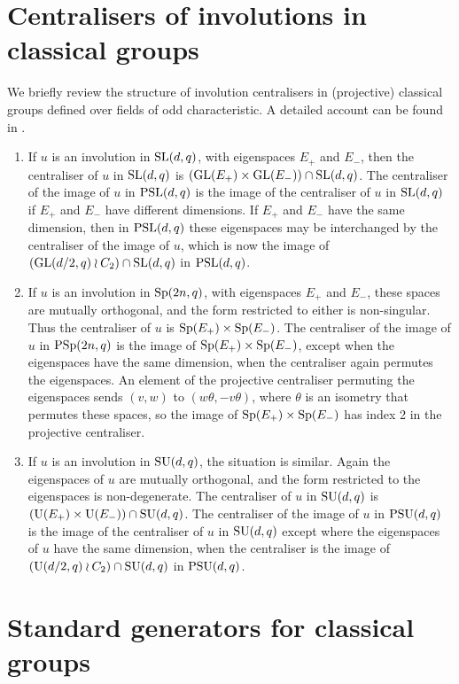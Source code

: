 \documentclass[12pt]{article}
\def\SL{{\rm SL}}
\def\GL{{\rm GL}}
\def\U{{\rm U}}
\def\PSL{{\rm PSL}}
\def\PSp{{\rm PSp}}
\def\PSU{{\rm PSU}}
\def\Sp{{\rm Sp}}
\def\SU{{\rm SU}}
\begin{document}
\section{Centralisers of involutions in classical groups}\label{cent} 
We briefly review the structure of involution centralisers 
in (projective) classical groups 
defined over fields of odd characteristic.
A detailed account can be found in \cite{GLS3}.
\begin{enumerate}
\item 
If $u$ is an involution in $\SL(d,q)$, with eigenspaces $E_+$ and
$E_-$, then the centraliser of $u$ in $\SL(d,q)$ is
$(\GL(E_+)\times\GL(E_-))\cap\SL(d,q)$. The centraliser of the
image of $u$ in $\PSL(d,q)$ is the image of the centraliser of $u$ in
$\SL(d,q)$ if $E_+$ and $E_-$ have different dimensions. If
$E_+$ and $E_-$ have the same dimension, then in $\PSL(d,q)$ these
eigenspaces may be interchanged by the centraliser of the image of
$u$, which is now the image of $(\GL(d/2,q)\wr C_2)\cap\SL(d,q)$ in
$\PSL(d,q)$.

\item 
If $u$ is an involution in $\Sp(2n,q)$, with eigenspaces $E_+$ and
$E_-$, these spaces are  mutually orthogonal, and the form restricted
to either is non-singular. Thus the centraliser of $u$ is 
$\Sp(E_+) \times \Sp(E_-)$. The centraliser of the image of $u$ in
$\PSp(2n,q)$ is the image of $\Sp(E_+)\times\Sp(E_-)$, except when the
eigenspaces have the same dimension, when the centraliser again
permutes the eigenspaces. An element of the projective
centraliser permuting the eigenspaces sends $(v,w)$ to
$(w\theta,-v\theta)$, where  $\theta$ is an isometry that permutes
these spaces, so the image of $\Sp(E_+)\times\Sp(E_-)$ has index 2
in the projective centraliser.

\item 
If $u$ is an involution in $\SU(d,q)$, the situation is similar.
Again the eigenspaces of $u$ are mutually orthogonal, and the form
restricted to the eigenspaces is non-degenerate. The centraliser of
$u$ in $\SU(d,q)$  is $(\U(E_+)\times\U(E_-))\cap\SU(d,q)$. The
centraliser of the image of $u$ in $\PSU(d,q)$ is the image of the
centraliser of $u$ in $\SU(d,q)$  except where the eigenspaces of
$u$ have the same dimension, when the centraliser is the image of
$(\U(d/2,q)\wr C_2)\cap\SU(d,q)$ in $\PSU(d,q)$.
\end{enumerate}

\section{Standard generators for classical groups}
\label{standard}
\end{document}
